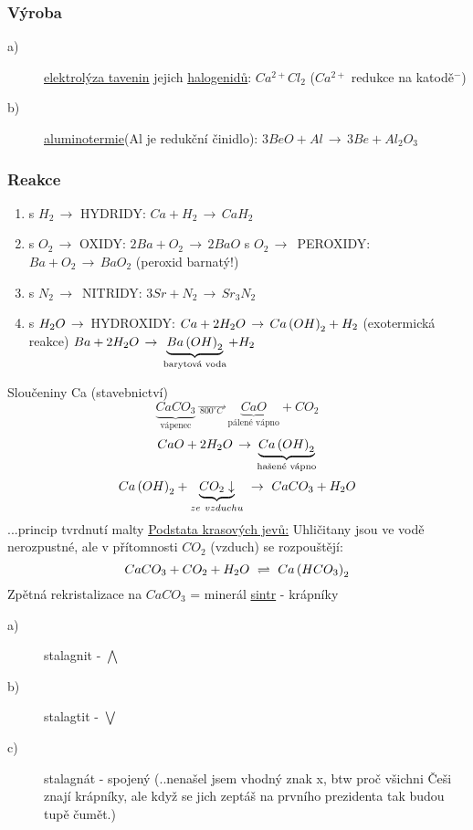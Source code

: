     \subsubsection{Výroba}
        \begin{description}
            \item[a)] \underline{elektrolýza tavenin} jejich \underline{halogenidů}: \textbf{\(Ca^{2+}Cl_2\)} ($Ca^{2+}$ redukce na katodě$^-$)
            \item[b)] \underline{aluminotermie}(Al je redukční činidlo): \(3BeO + Al \,\to\, 3Be + Al_2 O_3\)
        \end{description}
    \subsubsection{Reakce}
    \begin{enumerate}
        \item s $H_2 \,\to$ HYDRIDY: \tab $Ca + H_2 \,\to\, CaH_2$
        \item s $O_2 \,\to$ OXIDY: \tab $2Ba + O_2 \,\to\, 2BaO$
            \newline s $O_2 \,\to\,$ PEROXIDY: \tab $Ba + O_2 \,\to\, BaO_2$ (peroxid barnatý!)
        \item s $N_2 \,\to\,$ NITRIDY: \tab $3Sr + N_2 \,\to\, Sr_3 N_2$
        \item s $H_2O \,\to\,$ HYDROXIDY: \tab $Ca+2H_2O \,\to\, Ca \left( OH \right) _2 + H_2$ (exotermická reakce)
            \newline \tab\tab $Ba + 2H_2O \,\to\, \underbrace{Ba \left( OH \right) _2}_\text{barytová voda} + H_2$ 
    \end{enumerate}
    Sloučeniny Ca (stavebnictví)
    \[\underbrace{CaCO_3}_\text{vápenec} \,\overrightarrow{\, _{800^\circ C} \,} \, \underbrace{CaO}_\text{pálené vápno} + CO_2\]
    \newline
    \[CaO + 2H_2O \,\to\, \underbrace{Ca \left(OH\right)_2}_\text{hašené vápno}\]
    \newline
    \[Ca\left(OH\right)_2 + \underbrace{CO_2 \downarrow}_{ze~vzduchu} ~\to~ CaCO_3 + H_2O\] ...princip tvrdnutí malty
    \newline \newline
    \underline{Podstata krasových jevů:} Uhličitany jsou ve vodě nerozpustné, ale v přítomnosti $CO_2$ (vzduch) se rozpouštějí:
    \[CaCO_3 + CO_2 + H_2O ~\rightleftharpoons ~ Ca \left( HCO_3 \right)_2 \]
    Zpětná rekristalizace na $CaCO_3$ = minerál \underline{sintr} - krápníky
    \begin{description}
        \item[a)] stalagnit - $\bigwedge$
        \item[b)] stalagtit - $\bigvee$
        \item[c)] stalagnát - spojený \tiny{(..nenašel jsem vhodný znak x, btw proč všichni Češi znají krápníky, ale když se jich zeptáš na prvního prezidenta tak budou tupě čumět.)}
    \end{description}

